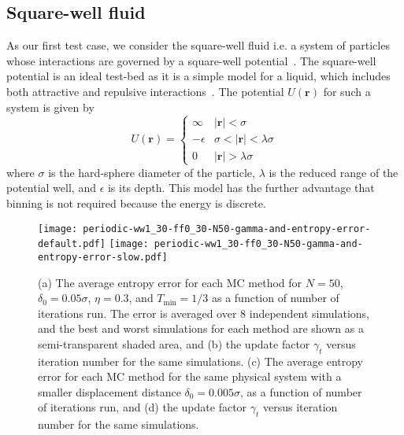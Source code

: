\documentclass[letterpaper,twocolumn,amsmath,amssymb,pre,aps,10pt]{revtex4-1}
\begin{document}
\subsection{Square-well fluid}
As our first test case, we consider the square-well fluid i.e. a
system of particles whose interactions are governed by a square-well
potential~\cite{singh2003surface, barker2004perturbationSW}.  The
square-well potential is an ideal test-bed as it is a simple model for
a liquid, which includes both attractive and repulsive
interactions~\cite{barker1967-SW-perturbation, vega1992phase}.
The
potential $U(\textbf{r})$ for such a system is given by
\begin{equation}
 U(\textbf{r})=\begin{cases} \infty &
 \lvert\textbf{r}\rvert< \sigma\\-\epsilon &
 \sigma<\lvert\textbf{r}\rvert<\lambda\sigma\\0 &
 \lvert\textbf{r}\rvert > \lambda\sigma\end{cases}
\end{equation}
where $\sigma$ is the hard-sphere diameter of the particle, $\lambda$ is the
reduced range of the potential well, and $\epsilon$ is its depth. This model has
the further advantage that binning is not required because the energy is
discrete.

\begin{figure*}
  \texttt{[image: periodic-ww1\_30-ff0\_30-N50-gamma-and-entropy-error-default.pdf]}%
\texttt{[image: periodic-ww1\_30-ff0\_30-N50-gamma-and-entropy-error-slow.pdf]}
  \caption{(a) The average entropy error for each MC method for $N=50$,
               $\delta_0 = 0.05\sigma$, $\eta = 0.3$, and $T_{\min} = 1/3$
               as a function of number of iterations run. The error is
               averaged over 8 independent simulations, and the best
               and worst simulations for each method are shown as a
               semi-transparent shaded area, and
           (b) the update factor $\gamma_t$ versus iteration number
               for the same simulations.
           (c) The average entropy error for each MC method for the
               same physical system with a smaller displacement distance
               $\delta_0 = 0.005\sigma$,
               as a function of number of iterations run, and
           (d) the update factor $\gamma_t$ versus iteration number
               for the same simulations.
  }\label{fig:fast-slow-gamma}
\end{figure*}
\end{document}
